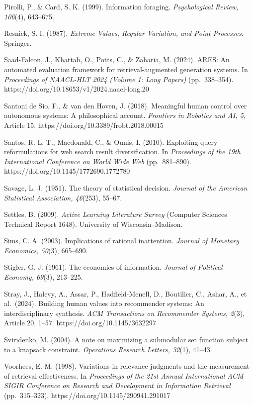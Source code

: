 \documentclass[
  11pt]{article}
\begin{document}
Pirolli, P., \& Card, S. K. (1999). Information foraging.
\emph{Psychological Review, 106}(4), 643--675.

Resnick, S. I. (1987). \emph{Extreme Values, Regular Variation, and
Point Processes}. Springer.

Saad-Falcon, J., Khattab, O., Potts, C., \& Zaharia, M. (2024). ARES: An
automated evaluation framework for retrieval-augmented generation
systems. In \emph{Proceedings of NAACL-HLT 2024 (Volume 1: Long Papers)}
(pp.~338--354). https://doi.org/10.18653/v1/2024.naacl-long.20

Santoni de Sio, F., \& van den Hoven, J. (2018). Meaningful human
control over autonomous systems: A philosophical account.
\emph{Frontiers in Robotics and AI, 5}, Article 15.
https://doi.org/10.3389/frobt.2018.00015

Santos, R. L. T., Macdonald, C., \& Ounis, I. (2010). Exploiting query
reformulations for web search result diversification. In
\emph{Proceedings of the 19th International Conference on World Wide
Web} (pp.~881--890). https://doi.org/10.1145/1772690.1772780

Savage, L. J. (1951). The theory of statistical decision. \emph{Journal
of the American Statistical Association, 46}(253), 55--67.

Settles, B. (2009). \emph{Active Learning Literature Survey} (Computer
Sciences Technical Report 1648). University of Wisconsin--Madison.

Sims, C. A. (2003). Implications of rational inattention. \emph{Journal
of Monetary Economics, 50}(3), 665--690.

Stigler, G. J. (1961). The economics of information. \emph{Journal of
Political Economy, 69}(3), 213--225.

Stray, J., Halevy, A., Assar, P., Hadfield-Menell, D., Boutilier, C.,
Ashar, A., et al.~(2024). Building human values into recommender
systems: An interdisciplinary synthesis. \emph{ACM Transactions on
Recommender Systems, 2}(3), Article 20, 1--57.
https://doi.org/10.1145/3632297

Sviridenko, M. (2004). A note on maximizing a submodular set function
subject to a knapsack constraint. \emph{Operations Research Letters,
32}(1), 41--43.

Voorhees, E. M. (1998). Variations in relevance judgments and the
measurement of retrieval effectiveness. In \emph{Proceedings of the 21st
Annual International ACM SIGIR Conference on Research and Development in
Information Retrieval} (pp.~315--323).
https://doi.org/10.1145/290941.291017
\end{document}
